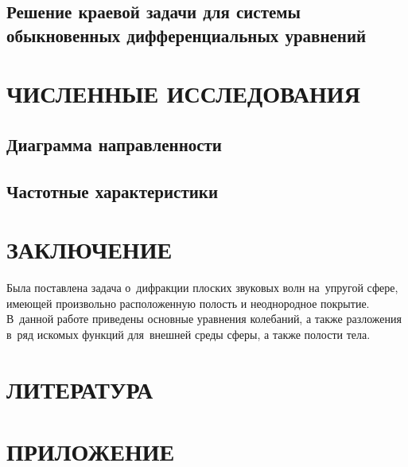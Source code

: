 \newpage
\subsection{Решение краевой задачи для системы обыкновенных дифференциальных уравнений}

\newpage
\section{ЧИСЛЕННЫЕ ИССЛЕДОВАНИЯ}

\newpage
\subsection{Диаграмма направленности}

\newpage
\subsection{Частотные характеристики}


\newpage
\section*{ЗАКЛЮЧЕНИЕ}
Была поставлена задача о~дифракции плоских звуковых волн на~упругой сфере, имеющей произвольно расположенную полость и неоднородное покрытие. В~данной работе приведены основные уравнения колебаний, а также разложения в~ряд искомых функций для~внешней среды сферы, а также полости тела.

\newpage
\section*{ЛИТЕРАТУРА}

\newpage
\section*{ПРИЛОЖЕНИЕ}
